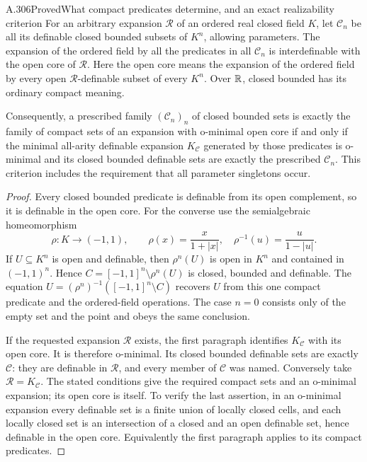 \begin{saresult}{A.306}{Proved}{What compact predicates determine, and an exact realizability criterion}
For an arbitrary expansion $\mathcal R$ of an ordered real closed field
$K$, let $\mathcal C_n$ be all its definable closed bounded subsets of
$K^n$, allowing parameters. The expansion of the ordered field by all
the predicates in all $\mathcal C_n$ is interdefinable with the open
core of $\mathcal R$. Here the open core means the expansion of the
ordered field by every open $\mathcal R$-definable subset of every
$K^n$. Over $\mathbb R$, closed bounded has its ordinary compact meaning.

Consequently, a prescribed family $(\mathcal C_n)_n$ of closed bounded
sets is exactly the family of compact sets of an expansion with
o-minimal open core if and only if the minimal all-arity definable
expansion $K_{\mathcal C}$ generated by those predicates is o-minimal
and its closed bounded definable sets are exactly the prescribed
$\mathcal C_n$. This criterion includes the requirement that all
parameter singletons occur.
\end{saresult}
\begin{proof}
Every closed bounded predicate is definable from its open complement,
so it is definable in the open core. For the converse use the
semialgebraic homeomorphism
\[
 \rho:K\longrightarrow(-1,1),\qquad
 \rho(x)=\frac{x}{1+|x|},
 \quad\rho^{-1}(u)=\frac{u}{1-|u|}.
\]
If $U\subseteq K^n$ is open and definable, then $\rho^n(U)$ is open
in $K^n$ and contained in $(-1,1)^n$. Hence
$C=[-1,1]^n\setminus\rho^n(U)$ is closed, bounded and definable.
The equation $U=(\rho^n)^{-1}([-1,1]^n\setminus C)$ recovers $U$
from this one compact predicate and the ordered-field operations.
The case $n=0$ consists only of the empty set and the point and obeys
the same conclusion.

If the requested expansion $\mathcal R$ exists, the first paragraph
identifies $K_{\mathcal C}$ with its open core. It is therefore
o-minimal. Its closed bounded definable sets are exactly $\mathcal C$:
they are definable in $\mathcal R$, and every member of $\mathcal C$
was named. Conversely take $\mathcal R=K_{\mathcal C}$. The stated
conditions give the required compact sets and an o-minimal expansion;
its open core is itself. To verify the last assertion, in an o-minimal
expansion every definable set is a finite union of locally closed cells,
and each locally closed set is an intersection of a closed and an open
definable set, hence definable in the open core. Equivalently the first
paragraph applies to its compact predicates.
\end{proof}

